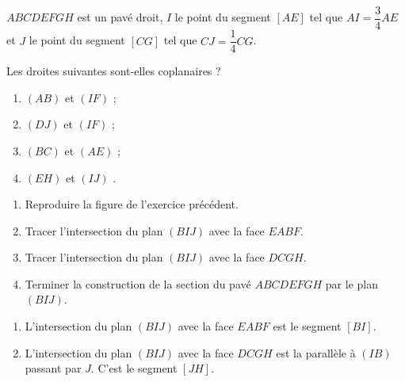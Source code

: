 \begin{colonne*exercice}
\begin{exercice}
  $ABCDEFGH$ est un pavé droit, $I$ le point du segment $[AE]$ tel que
  $AI=\dfrac{3}{4}AE$ et $J$ le point du segment $[CG]$ tel que
  $CJ=\dfrac{1}{4}CG$.

  Les droites suivantes sont-elles coplanaires ?
  \begin{enumerate}
  \item $(AB)$ et $(IF)$ ;
  \item $(DJ)$ et $(IF)$ ;
  \item $(BC)$ et $(AE)$ ;
  \item $(EH)$ et $(IJ)$ .
  \end{enumerate}
\end{exercice}


\begin{exercice*}\label{ex23G2}

\vspace{-\baselineskip}
  \begin{enumerate}
  \item Reproduire la figure de l'exercice précédent.
  \item Tracer l'intersection du plan $(BIJ)$ avec la face $EABF$.
  \item Tracer l'intersection du plan $(BIJ)$ avec la face $DCGH$.
  \item Terminer la construction de la section du pavé $ABCDEFGH$ par
    le plan $(BIJ)$.
  \end{enumerate}
\end{exercice*}
\begin{corrige}
  \begin{enumerate}
\item L'intersection du plan $(BIJ)$ avec la face $EABF$ est le segment $[BI]$.
\item L'intersection du plan $(BIJ)$ avec la face $DCGH$ est la
  parallèle à $(IB)$ passant par $J$. C'est le segment $[JH]$.


\end{enumerate}
\end{corrige}
\end{colonne*exercice}
